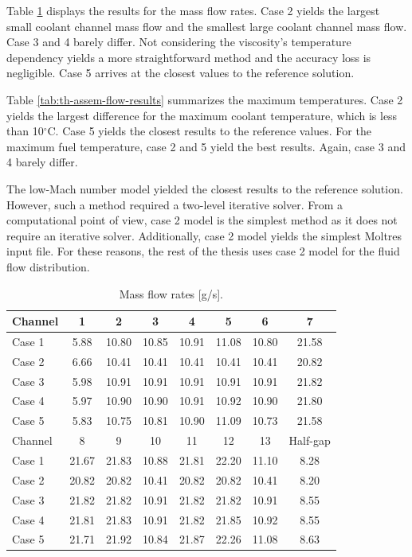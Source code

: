 Table \ref{tab:th-assem-flow-massflow} displays the results for the mass flow rates.
Case 2 yields the largest small coolant channel mass flow and the smallest large coolant channel mass flow.
Case 3 and 4 barely differ.
Not considering the viscosity's temperature dependency yields a more straightforward method and the accuracy loss is negligible.
Case 5 arrives at the closest values to the reference solution.

Table \ref{tab:th-assem-flow-results} summarizes the maximum temperatures.
Case 2 yields the largest difference for the maximum coolant temperature, which is less than 10$^{\circ}$C.
Case 5 yields the closest results to the reference values.
For the maximum fuel temperature, case 2 and 5 yield the best results.
Again, case 3 and 4 barely differ.

The low-Mach number model yielded the closest results to the reference solution.
However, such a method required a two-level iterative solver.
From a computational point of view, case 2 model is the simplest method as it does not require an iterative solver.
Additionally, case 2 model yields the simplest Moltres input file.
For these reasons, the rest of the thesis uses case 2 model for the fluid flow distribution.

\begin{table}[htbp!]
  \centering
  \caption{Mass flow rates [g/s].}
  \label{tab:th-assem-flow-massflow}
  \begin{tabular}{l|ccccccc}
\toprule
Channel & 1 & 2 & 3 & 4 & 5 & 6 & 7 \\
\midrule
Case 1  & 5.88 & 10.80 & 10.85 & 10.91 & 11.08 & 10.80 & 21.58 \\
Case 2  & 6.66 & 10.41 & 10.41 & 10.41 & 10.41 & 10.41 & 20.82 \\
Case 3  & 5.98 & 10.91 & 10.91 & 10.91 & 10.91 & 10.91 & 21.82 \\
Case 4  & 5.97 & 10.90 & 10.90 & 10.91 & 10.92 & 10.90 & 21.80 \\
Case 5  & 5.83 & 10.75 & 10.81 & 10.90 & 11.09 & 10.73 & 21.58 \\
\midrule
Channel & 8 & 9 & 10 & 11 & 12 & 13 & Half-gap \\
\midrule
Case 1  & 21.67 & 21.83 & 10.88 & 21.81 & 22.20 & 11.10 & 8.28 \\
Case 2  & 20.82 & 20.82 & 10.41 & 20.82 & 20.82 & 10.41 & 8.20 \\
Case 3  & 21.82 & 21.82 & 10.91 & 21.82 & 21.82 & 10.91 & 8.55 \\
Case 4  & 21.81 & 21.83 & 10.91 & 21.82 & 21.85 & 10.92 & 8.55 \\
Case 5  & 21.71 & 21.92 & 10.84 & 21.87 & 22.26 & 11.08 & 8.63 \\
\bottomrule
\end{tabular}
\end{table}

